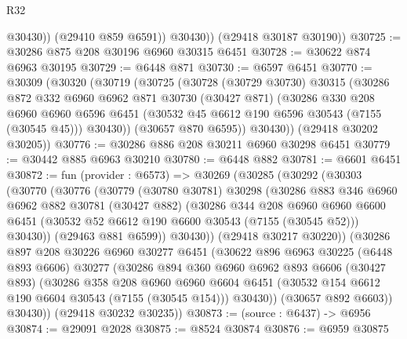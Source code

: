 \begin{lexlean}{R32}
\begin{coremodule}
                @30430))
            (@29410 @859 @6591))
          @30430))
      (@29418 @30187 @30190))
@30725 := @30286 @875 @208 @30196 @6960 @30315 @6451
@30728 := @30622 @874 @6963 @30195
@30729 := @6448 @871
@30730 := @6597 @6451
@30770 := @30309
    (@30320
      (@30719
        (@30725
          (@30728
            (@30729 @30730)
            @30315
            (@30286
              @872
              @332
              @6960
              @6962
              @871
              @30730
              (@30427 @871)
              (@30286
                @330
                @208
                @6960
                @6960
                @6596
                @6451
                (@30532 @45 @6612 @190 @6596 @30543 (@7155 (@30545 @45)))
                @30430))
            (@30657 @870 @6595))
          @30430))
      (@29418 @30202 @30205))
@30776 := @30286 @886 @208 @30211 @6960 @30298 @6451
@30779 := @30442 @885 @6963 @30210
@30780 := @6448 @882
@30781 := @6601 @6451
@30872 := fun (provider : @6573) =>
  @30269
    (@30285
      (@30292
        (@30303
          (@30770
            (@30776
              (@30779
                (@30780 @30781)
                @30298
                (@30286
                  @883
                  @346
                  @6960
                  @6962
                  @882
                  @30781
                  (@30427 @882)
                  (@30286
                    @344
                    @208
                    @6960
                    @6960
                    @6600
                    @6451
                    (@30532 @52 @6612 @190 @6600 @30543 (@7155 (@30545 @52)))
                    @30430))
                (@29463 @881 @6599))
              @30430))
          (@29418 @30217 @30220))
        (@30286
          @897
          @208
          @30226
          @6960
          @30277
          @6451
          (@30622
            @896
            @6963
            @30225
            (@6448 @893 @6606)
            @30277
            (@30286
              @894
              @360
              @6960
              @6962
              @893
              @6606
              (@30427 @893)
              (@30286
                @358
                @208
                @6960
                @6960
                @6604
                @6451
                (@30532 @154 @6612 @190 @6604 @30543 (@7155 (@30545 @154)))
                @30430))
            (@30657 @892 @6603))
          @30430))
      (@29418 @30232 @30235))
@30873 := (source : @6437) -> @6956
@30874 := @29091 @2028
@30875 := @8524 @30874
@30876 := @6959 @30875

\end{coremodule}
\end{lexlean}
